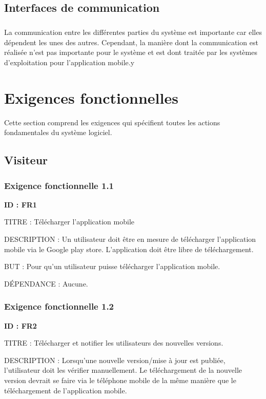 \documentclass[titlepage, 12pt]{report}
\begin{document}
\section{Interfaces de communication}

\paragraph{}La communication entre les différentes parties du système est importante car elles dépendent les unes des autres. Cependant, la manière dont la communication est réalisée n'est pas importante pour le système et est dont traitée par les systèmes d'exploitation pour l'application mobile.y

\chapter{Exigences fonctionnelles}

Cette section comprend les exigences qui spécifient toutes les actions fondamentales du système logiciel.

\section{Visiteur}

\subsection{Exigence fonctionnelle 1.1}

\textbf{ID : FR1}

TITRE : Télécharger l'application mobile

DESCRIPTION : Un utilisateur doit être en mesure de télécharger l'application mobile via le Google play store. L'application doit être libre de téléchargement.

BUT : Pour qu'un utilisateur puisse télécharger l'application mobile.

DÉPENDANCE : Aucune.

\subsection{Exigence fonctionnelle 1.2}

\textbf{ID : FR2}

TITRE : Télécharger et notifier les utilisateurs des nouvelles versions.

DESCRIPTION : Lorsqu'une nouvelle version/mise à jour est publiée, l'utilisateur doit les vérifier manuellement. Le téléchargement de la nouvelle version devrait se faire via le téléphone mobile de la même manière que le téléchargement de l'application mobile.
\end{document}
